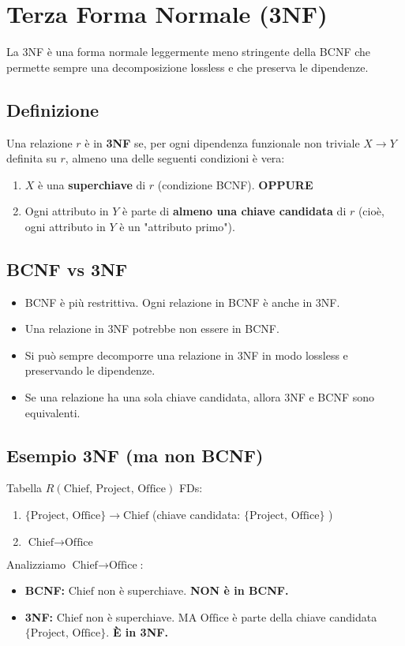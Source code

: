 \documentclass{article}
\begin{document}
	\section{Terza Forma Normale (3NF)}
	La 3NF è una forma normale leggermente meno stringente della BCNF che permette sempre una decomposizione lossless e che preserva le dipendenze.
	
	\subsection{Definizione}
	Una relazione $r$ è in \textbf{3NF} se, per ogni dipendenza funzionale non triviale $X \rightarrow Y$ definita su $r$, almeno una delle seguenti condizioni è vera:
	\begin{enumerate}
		\item $X$ è una \textbf{superchiave} di $r$ (condizione BCNF).
		\textbf{OPPURE}
		\item Ogni attributo in $Y$ è parte di \textbf{almeno una chiave candidata} di $r$ (cioè, ogni attributo in $Y$ è un "attributo primo").
	\end{enumerate}
	
	\subsection{BCNF vs 3NF}
	\begin{itemize}
		\item BCNF è più restrittiva. Ogni relazione in BCNF è anche in 3NF.
		\item Una relazione in 3NF potrebbe non essere in BCNF.
		\item Si può sempre decomporre una relazione in 3NF in modo lossless e preservando le dipendenze.
		\item Se una relazione ha una sola chiave candidata, allora 3NF e BCNF sono equivalenti.
	\end{itemize}
	
	\subsection{Esempio 3NF (ma non BCNF)}
	Tabella $R(\text{Chief, Project, Office})$
	FDs:
	\begin{enumerate}
		\item $\{\text{Project, Office}\} \rightarrow \text{Chief}$ (chiave candidata: $\{\text{Project, Office}\}$ )
		\item $\text{Chief} \rightarrow \text{Office}$
	\end{enumerate}
	Analizziamo $\text{Chief} \rightarrow \text{Office}$:
	\begin{itemize}
		\item \textbf{BCNF:} $\text{Chief}$ non è superchiave. \textbf{NON è in BCNF.}
		\item \textbf{3NF:} $\text{Chief}$ non è superchiave. MA $\text{Office}$ è parte della chiave candidata $\{\text{Project, Office}\}$. \textbf{È in 3NF.}
	\end{itemize}
	
\end{document}
